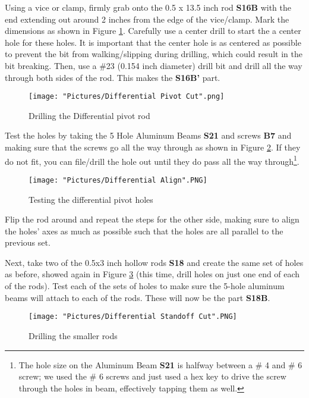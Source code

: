 \documentclass[12pt]{article}
\begin{document}
Using a vice or clamp, firmly grab onto the 0.5 x 13.5 inch rod \textbf{S16B} with the end extending out around 2 inches from the edge of the vice/clamp. Mark the dimensions as shown in Figure \ref{diff pivot rod}. Carefully use a center drill to start the a center hole for these holes. It is important that the center hole is as centered as possible to prevent the bit from walking/slipping during drilling, which could result in the bit breaking. Then, use a \#23 (0.154 inch diameter) drill bit and drill all the way through both sides of the rod. This makes the \textbf{S16B'} part.

\begin{figure}[H]
\centering
  \texttt{[image: "Pictures/Differential Pivot Cut".png]}
	\caption{Drilling the Differential pivot rod}
	\label{diff pivot rod}
\end{figure}


Test the holes by taking the 5 Hole Aluminum Beams \textbf{S21} and screws \textbf{B7} and making sure that the screws go all the way through as shown in Figure \ref{test}. If they do not fit, you can file/drill the hole out until they do pass all the way through\footnote{The hole size on the Aluminum Beam \textbf{S21} is halfway between a \# 4 and \# 6 screw; we used the \# 6 screws and just used a hex key to drive the screw through the holes in beam, effectively tapping them as well.}.

\begin{figure}[H]
	\centering
	\texttt{[image: "Pictures/Differential Align".PNG]}
	\caption{Testing the differential pivot holes}
	\label{test}
\end{figure}

\noindent Flip the rod around and repeat the steps for the other side, making sure to align the holes' axes as much as possible such that the holes are all parallel to the previous set.


\noindent Next, take two of the 0.5x3 inch hollow rods \textbf{S18} and create the same set of holes as before, showed again in Figure \ref{dpv} (this time, drill holes on just one end of each of the rods). Test each of the sets of holes to make sure the 5-hole aluminum beams will attach to each of the rods. These will now be the part \textbf{S18B}.

\begin{figure}[H]
	\centering
	\texttt{[image: "Pictures/Differential Standoff Cut".PNG]}
	\caption{Drilling the smaller rods}
	\label{dpv}
\end{figure}
\end{document}
